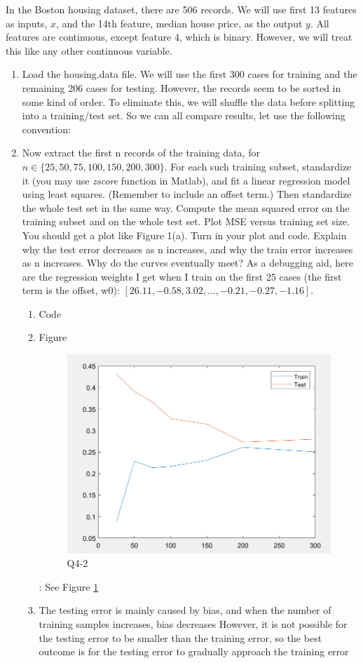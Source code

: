\documentclass[11pt]{article}
\newcommand{\mfile}[1]  {{\small }} %
\begin{document}
In the Boston housing dataset, there are 506 records. We will
use first 13 features as inputs, $x$, and the 14th feature, median house price, as the output $y$. All features are continuous,
except feature 4, which is binary. However, we will treat this like any other continuous variable.
\begin{enumerate}
	\item Load the housing.data file. We will use the first 300 cases for training and the remaining 206 cases for
	testing. However, the records seem to be sorted in some kind of order. To eliminate this, we will shuffle the data
	before splitting into a training/test set. So we can all compare results, let use the following convention:
	\mfile{sample.m}
	\item Now extract the first n records of the training data, for $n \in \{25, 50, 75, 100, 150, 200, 300\}$. For each such
	training subset, standardize it (you may use \textit{zscore} function in Matlab), and fit a linear regression model using least squares. (Remember to include
	an offset term.) Then standardize the whole test set in the same way. Compute the mean squared error on
	the training subset and on the whole test set. Plot MSE versus training set size. You should get a plot like
	Figure 1(a). Turn in your plot and code. Explain why the test error decreases as n increases, and why the train
	error increases as n increases. Why do the curves eventually meet?
	As a debugging aid, here are the regression weights I get when I train on the first 25 cases (the first term is the
	offset, w0): $[26.11, -0.58, 3.02,\dots,-0.21, -0.27, -1.16]$.
	\begin{enumerate}
		\item Code
		\mfile{q2.m}
		\item Figure
		\begin{figure}[h!]
			\centering
			\includegraphics[width=0.5\linewidth]{q42.png}
			\caption{Q4-2}
			\label{fig:Q4_2}
		\end{figure}:
		See Figure \ref{fig:Q4_2}
		\item The testing error is mainly caused by bias, and when the number of training samples increases, bias decreases
		However, it is not possible for the testing error to be smaller than the training error, so the best outcome is for the testing error to gradually approach the training error
	\end{enumerate}
	

\end{enumerate}
\end{document}
